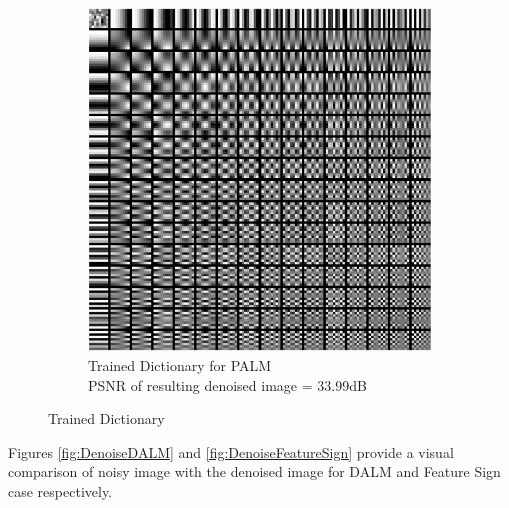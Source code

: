 \documentclass{article} %
\begin{document}
\begin{figure}[H]
\begin{subfigure}[b]{0.5\textwidth}
                \includegraphics[width=\textwidth]{images/Trained_dict_PALM}
                \caption{Trained Dictionary for PALM\\PSNR of resulting denoised image = 33.99dB}
                \label{fig:DictPALM}
        \end{subfigure}
        \caption{Trained Dictionary}\label{fig:Dict}
\end{figure}

Figures \ref{fig:DenoiseDALM} and \ref{fig:DenoiseFeatureSign}  provide a visual comparison of noisy image with the denoised image for DALM and Feature Sign case respectively.
\end{document}
